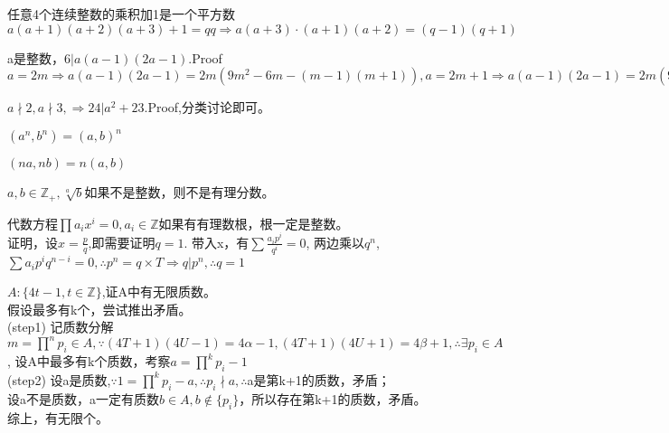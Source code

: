\documentclass[UTF8]{../09-Mathematics}
\begin{document}
\begin{proposition}
    任意4个连续整数的乘积加1是一个平方数$ a(a+1)(a+2)(a+3)+ 1 = qq \Rightarrow a(a+3) \cdot (a+1)(a+2)=(q-1)(q+1) $
\end{proposition}

\begin{proposition}
    a是整数，$6|a(a-1)(2a-1)$.Proof$a = 2m \Rightarrow a(a-1)(2a-1)=2m(9m^2 -6m-(m-1)(m+1)),a = 2m+1 \Rightarrow a(a-1)(2a-1)=2m(9m^2 +6m-(m-1)(m+1))  $
\end{proposition}

\begin{proposition}
    $ a\nmid 2 , a \nmid 3, \Rightarrow 24 | a^2+23$.Proof,分类讨论即可。
\end{proposition}

\begin{proposition}
    $ (a^n, b^n) = (a,b)^n$

    $ (na, nb) = n(a,b)$
\end{proposition}

\begin{proposition}
    $a,b \in \mathbb Z_+, \sqrt[a]{b}$如果不是整数，则不是有理分数。
\end{proposition}

\begin{proposition}
    代数方程$\prod a_ix^i = 0, a_i  \in \mathbb Z$如果有有理数根，根一定是整数。\\
    证明，设$x = \frac{p}{q}$,即需要证明$q = 1$. 带入x，有$\sum \frac{a_i p^i}{q^i} = 0$, 两边乘以$q^n$, $\sum a_i p^iq^{n-i} = 0, \therefore p^n = q \times T \Rightarrow q|p^n, \therefore q = 1$
\end{proposition}

\begin{proposition}
    $A:\{ 4t-1, t \in \mathbb Z\}$,证A中有无限质数。\\

    假设最多有k个，尝试推出矛盾。\\
    (step1) 记质数分解$m = \prod^{n}p_i \in A, \because (4T+1)(4U-1)=4\alpha -1, (4T+1)(4U+1)=4\beta +1, \therefore \exists p_i \in A$, 设A中最多有k个质数，考察$a =\prod^{k}p_i-1 $\\
    (step2) 设a是质数,$\because 1 =\prod^{k}p_i - a, \therefore p_i \nmid a, \therefore $a是第k+1的质数，矛盾；\\
    设a不是质数，a一定有质数$b \in A, b\notin \{ p_i\}$，所以存在第k+1的质数，矛盾。\\
    综上，有无限个。



\end{proposition}
\end{document}
